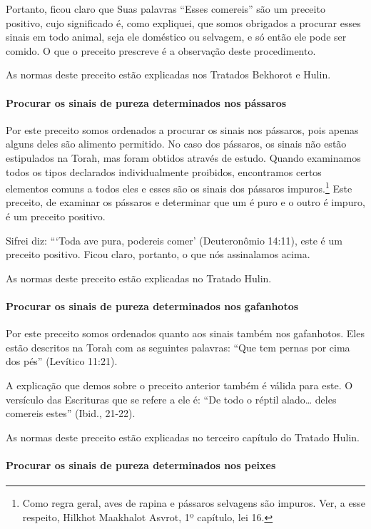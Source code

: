 Portanto, ficou claro que Suas palavras ``Esses comereis'' são um preceito positivo, cujo significado é, como expliquei, que somos obrigados
a procurar esses sinais em todo animal, seja ele doméstico ou selvagem,
e só então ele pode ser comido. O que o preceito prescreve é a
observação deste procedimento.

As normas deste preceito estão explicadas nos Tratados Bekhorot e Hulin.

\paragraph{Procurar os sinais de pureza determinados nos pássaros}

Por este preceito somos ordenados a procurar os sinais nos pássaros,
pois apenas alguns deles são alimento permitido. No caso dos pássaros,
os sinais não estão estipulados na Torah, mas foram obtidos através de
estudo. Quando examinamos todos os tipos declarados individualmente
proibidos, encontramos certos elementos comuns a todos eles e esses são
os sinais dos pássaros impuros.\footnote{Como regra geral, aves de rapina e pássaros selvagens são impuros.
Ver, a esse respeito, Hilkhot Maakhalot Asvrot, 1º capítulo, lei 16.} Este preceito, de examinar os pássaros e
determinar que um é puro e o outro é impuro, é um preceito positivo.

Sifrei diz: ```Toda ave pura, podereis comer' (Deuteronômio 14:11), este
é um preceito positivo. Ficou claro, portanto, o que nós assinalamos
acima.

As normas deste preceito estão explicadas no Tratado Hulin.

\paragraph{Procurar os sinais de pureza determinados nos gafanhotos}

Por este preceito somos ordenados quanto aos sinais também nos
gafanhotos. Eles estão descritos na Torah com as seguintes palavras:
``Que tem pernas por cima dos pés'' (Levítico 11:21).

A explicação que demos sobre o preceito anterior também é válida para
este. O versículo das Escrituras que se refere a ele é: ``De todo o
réptil alado\ldots{} deles comereis estes'' (Ibid., 21-22).

As normas deste preceito estão explicadas no terceiro capítulo do
Tratado Hulin.

\paragraph{Procurar os sinais de pureza determinados nos peixes}

